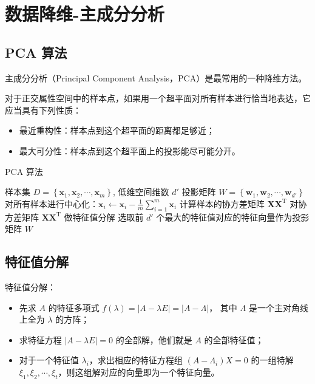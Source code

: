 \section{数据降维-主成分分析}
\subsection{PCA 算法}
主成分分析（Principal Component Analysis，PCA）是最常用的一种降维方法。

对于正交属性空间中的样本点，如果用一个超平面对所有样本进行恰当地表达，它应当具有下列性质：

\begin{itemize}
    \item 最近重构性：样本点到这个超平面的距离都足够近；
    \item 最大可分性：样本点到这个超平面上的投影能尽可能分开。
\end{itemize}

\begin{algorithm}[H]
    \renewcommand{\algorithmicrequire}{\textbf{Input:}}
	\renewcommand{\algorithmicensure}{\textbf{Output:}}
    \caption{PCA 算法}
    \begin{algorithmic}[1]
        \REQUIRE 样本集 $D = \left\{\boldsymbol{x}_1, \boldsymbol{x}_2, \cdots, \boldsymbol{x}_m\right\}$, 低维空间维数 $d'$
        \ENSURE 投影矩阵 $W = \left\{\boldsymbol{w}_1, \boldsymbol{w}_2, \cdots, \boldsymbol{w}_{d'}\right\}$
        \STATE 对所有样本进行中心化：$\boldsymbol{x}_i \leftarrow \boldsymbol{x}_i - \frac 1m \sum_{i=1}^m \boldsymbol{x}_i$
        \STATE 计算样本的协方差矩阵 $\mathbf{XX}^\mathrm T$
        \STATE 对协方差矩阵 $\mathbf{XX}^\mathrm T$ 做特征值分解
        \STATE 选取前 $d'$ 个最大的特征值对应的特征向量作为投影矩阵 $W$
    \end{algorithmic}
\end{algorithm}

\subsection{特征值分解}
特征值分解：

\begin{itemize}
    \item 先求 $A$ 的特征多项式 $f(\lambda) = |A - \lambda E| = |A - \Lambda|$，
    其中 $\Lambda$ 是一个主对角线上全为 $\lambda$ 的方阵；
    \item 求特征方程 $|A - \lambda E| = 0$ 的全部解，他们就是 $A$ 的全部特征值；
    \item  对于一个特征值 $\lambda_i$，求出相应的特征方程组 $(A - \Lambda_i)X = 0$ 的一组特解
     $\xi_1, \xi_2, \cdots, \xi_t$，则这组解对应的向量即为一个特征向量。
\end{itemize}

